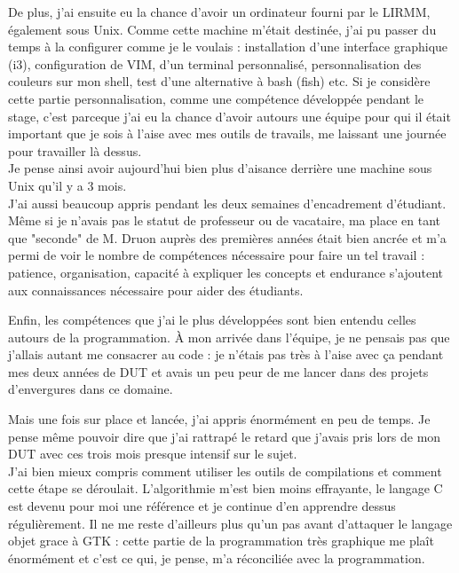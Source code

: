 \documentclass[11pt,french,a4paper]{report}
\begin{document}
De plus, j'ai ensuite eu la chance d'avoir un ordinateur fourni par le LIRMM, également sous Unix.
Comme cette machine m'était destinée, j'ai pu passer du temps à la configurer comme je le voulais : 
installation d'une interface graphique (i3), configuration de VIM, d'un terminal personnalisé, personnalisation des couleurs 
sur mon shell, test d'une alternative à bash (fish) etc. 
Si je considère cette partie personnalisation, comme une compétence développée pendant le stage, c'est parceque j'ai eu la chance 
d'avoir autours une équipe pour qui il était important que je sois à l'aise avec mes outils de travails, me laissant une 
journée pour travailler là dessus. \\
Je pense ainsi avoir aujourd'hui bien plus d'aisance derrière une machine sous Unix qu'il y a 3 mois. \\


J'ai aussi beaucoup appris pendant les deux semaines d'encadrement d'étudiant. Même si je n'avais pas le statut de professeur 
ou de vacataire, ma place en tant que "seconde" de M. Druon auprès des premières années était bien ancrée 
et m'a permi de voir le nombre de compétences nécessaire pour faire un tel travail : patience, organisation, 
capacité à expliquer les concepts et endurance s'ajoutent aux connaissances nécessaire pour aider des étudiants. 


Enfin, les compétences que j'ai le plus développées sont bien entendu celles autours de la programmation. 
À mon arrivée dans l'équipe, je ne pensais pas que j'allais autant me consacrer au code : je n'étais pas très à l'aise avec ça 
pendant mes deux années de DUT et avais un peu peur de me lancer dans des projets d'envergures dans ce domaine. 

Mais une fois sur place et lancée, j'ai appris énormément en peu de temps. Je pense même pouvoir dire que j'ai rattrapé le retard 
que j'avais pris lors de mon DUT avec ces trois mois presque intensif sur le sujet. \\

J'ai bien mieux compris comment utiliser les outils de compilations et comment cette étape se déroulait. L'algorithmie m'est bien moins
effrayante, le langage C est devenu pour moi une référence et je continue d'en apprendre dessus régulièrement. 
Il ne me reste d'ailleurs plus qu'un pas avant d'attaquer le langage objet grace à GTK : cette partie de la programmation très graphique
me plaît énormément et c'est ce qui, je pense, m'a réconciliée avec la programmation. \\
\end{document}
